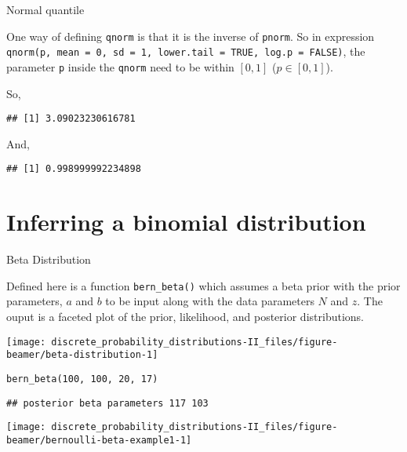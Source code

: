 \documentclass[ignorenonframetext,aspectratio=169]{beamer}
\begin{document}
\begin{frame}[fragile]{Normal quantile}
\protect\hypertarget{normal-quantile}{}

One way of defining \texttt{qnorm} is that it is the inverse of
\texttt{pnorm}. So in expression
\texttt{qnorm(p,\ mean\ =\ 0,\ sd\ =\ 1,\ lower.tail\ =\ TRUE,\ log.p\ =\ FALSE)},
the parameter \texttt{p} inside the \texttt{qnorm} need to be within
\([0, 1]\) (\(p \in [0,1]\)).

So,

\begin{verbatim}
## [1] 3.09023230616781
\end{verbatim}

And,

\begin{verbatim}
## [1] 0.998999992234898
\end{verbatim}

\end{frame}

\hypertarget{inferring-a-binomial-distribution}{%
\section{Inferring a binomial
distribution}\label{inferring-a-binomial-distribution}}

\begin{frame}[fragile]{Beta Distribution}
\protect\hypertarget{beta-distribution}{}

Defined here is a function \texttt{bern\_beta()} which assumes a beta
prior with the prior parameters, \(a\) and \(b\) to be input along with
the data parameters \(N\) and \(z\). The ouput is a faceted plot of the
prior, likelihood, and posterior distributions.

\begin{center}\texttt{[image: discrete\_probability\_distributions-II\_files/figure-beamer/beta-distribution-1]} \end{center}

\end{frame}

\begin{frame}[fragile]{}
\protect\hypertarget{section-3}{}

\texttt{bern\_beta(100,\ 100,\ 20,\ 17)}

\begin{verbatim}
## posterior beta parameters 117 103
\end{verbatim}

\begin{center}\texttt{[image: discrete\_probability\_distributions-II\_files/figure-beamer/bernoulli-beta-example1-1]} \end{center}

\end{frame}
\end{document}
